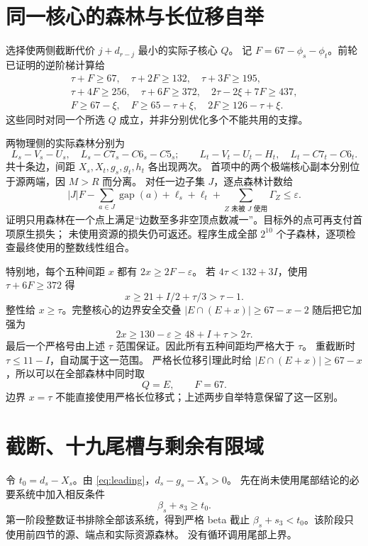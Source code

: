 \documentclass[11pt,a4paper]{article}
\begin{document}
\section{同一核心的森林与长位移自举}
选择使两侧截断代价 $j+d_{r-j}$ 最小的实际子核心 $Q$。
记 $F=67-\phi_s-\phi_t$。前轮已证明的逆阶梯计算给
\begin{gather*}
\tau+F\ge67,\quad\tau+2F\ge132,\quad\tau+3F\ge195,\\
\tau+4F\ge256,\quad\tau+6F\ge372,
\quad2\tau-2\xi+7F\ge437,\\
 F\ge67-\xi,\quad F\ge65-\tau+\xi,
 \quad2F\ge126-\tau+\xi.
\end{gather*}
这些同时对同一个所选 $Q$ 成立，并非分别优化多个不能共用的支撑。

两物理侧的实际森林分别为
\[
 L_s-V_s-U_s,\quad L_s-C7_s-C6_s-C5_s;
\qquad L_t-V_t-U_t-H_t,\quad L_t-C7_t-C6_t.
\]
共十条边，间距 $X_s,X_t,g_s,g_t,h_t$ 各出现两次。
首项中的两个极端核心副本分别位于源两端，因 $M>R$ 而分离。
对任一边子集 $J$，逐点森林计数给
\begin{equation}
 |J|F-\sum_{a\in J}\operatorname{gap}(a)+\ell_s+\ell_t
 +\sum_{Z\text{ 未被 }J\text{ 使用}}\Gamma_Z\le\varepsilon.
 \label{eq:forest}
\end{equation}
证明只用森林在一个点上满足“边数至多非空顶点数减一”。目标外的点可再支付首项原生损失；
未使用资源的损失仍可返还。程序生成全部 $2^{10}$ 个子森林，逐项检查最终使用的整数线性组合。

特别地，每个五种间距 $x$ 都有 $2x\ge2F-\varepsilon$。
若 $4\tau<132+3I$，使用 $\tau+6F\ge372$ 得
\[
 x\ge21+I/2+\tau/3>\tau-1.
\]
整性给 $x\ge\tau$。完整核心的边界安全交叠
$|E\cap(E+x)|\ge67-x-2$ 随后把它加强为
\[
 2x\ge130-\varepsilon\ge48+I+\tau>2\tau.
\]
最后一个严格号由上述 $\tau$ 范围保证。因此所有五种间距均严格大于 $\tau$。
重截断时 $\tau\le11-I$，自动属于这一范围。
严格长位移引理此时给 $|E\cap(E+x)|\ge67-x$，所以可以在全部森林中同时取
\begin{equation}Q=E,\qquad F=67.\label{eq:full}
\end{equation}
边界 $x=\tau$ 不能直接使用严格长位移式；上述两步自举特意保留了这一区别。

\section{截断、十九尾槽与剩余有限域}
令 $t_0=d_s-X_s$。由 \eqref{eq:leading}，$d_s-g_s-X_s>0$。
先在尚未使用尾部结论的必要系统中加入相反条件
\[
 \beta_s+s_3\ge t_0.
\]
第一阶段整数证书排除全部该系统，得到严格 beta 截止
$\beta_s+s_3<t_0$。该阶段只使用前四节的源、端点和实际资源森林。
没有循环调用尾部上界。
\end{document}
